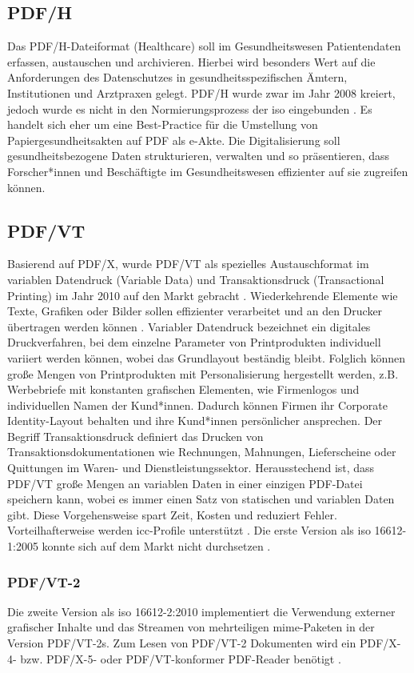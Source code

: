 \subsection{PDF/H}
Das PDF/H-Dateiformat (Healthcare) soll im Gesundheitswesen Patientendaten erfassen, austauschen und archivieren. Hierbei wird besonders Wert auf die Anforderungen des Datenschutzes in gesundheitsspezifischen Ämtern, Institutionen und Arztpraxen gelegt. PDF/H wurde zwar im Jahr 2008 kreiert, jedoch wurde es nicht in den Normierungsprozess der \gls{iso} eingebunden \cite{proj-consult}. Es handelt sich eher um eine Best-Practice für die Umstellung von Papiergesundheitsakten auf PDF als e-Akte. Die Digitalisierung soll gesundheitsbezogene Daten strukturieren, verwalten und so präsentieren, dass Forscher*innen und Beschäftigte im Gesundheitswesen effizienter auf sie zugreifen können.

\subsection{PDF/VT}
Basierend auf PDF/X, wurde PDF/VT als spezielles Austauschformat im variablen Datendruck (Variable Data) und Transaktionsdruck (Transactional Printing) im Jahr 2010 auf den Markt gebracht \cite{adobe-pdf-vt}.  Wiederkehrende Elemente wie Texte, Grafiken oder Bilder sollen effizienter verarbeitet und an den Drucker übertragen werden können \cite{adobe-pdf-e}. Variabler Datendruck bezeichnet ein digitales Druckverfahren, bei dem einzelne Parameter von Printprodukten individuell variiert werden können, wobei das Grundlayout beständig bleibt. Folglich können große Mengen von Printprodukten mit Personalisierung hergestellt werden, z.B. Werbebriefe mit konstanten grafischen Elementen, wie Firmenlogos und individuellen Namen der Kund*innen. Dadurch können Firmen ihr Corporate Identity-Layout behalten und ihre Kund*innen persönlicher ansprechen. Der Begriff Transaktionsdruck definiert das Drucken von Transaktionsdokumentationen wie Rechnungen, Mahnungen, Lieferscheine oder Quittungen im Waren- und Dienstleistungssektor. Herausstechend ist, dass PDF/VT große Mengen an variablen Daten in einer einzigen PDF-Datei speichern kann, wobei es immer einen Satz von statischen und variablen Daten gibt. Diese Vorgehensweise spart Zeit, Kosten und reduziert Fehler. Vorteilhafterweise werden \gls{icc}-Profile unterstützt \cite{adobe-pdf-vt}. Die erste Version als \gls{iso} 16612-1:2005 konnte sich auf dem Markt nicht durchsetzen \cite{proj-consult}.

\subsubsection{PDF/VT-2}
Die zweite Version als \gls{iso} 16612-2:2010 implementiert die Verwendung externer grafischer Inhalte und das Streamen von mehrteiligen \gls{mime}-Paketen in der Version PDF/VT-2s. Zum Lesen von PDF/VT-2 Dokumenten wird ein PDF/X-4- bzw. PDF/X-5- oder PDF/VT-konformer PDF-Reader benötigt \cite{proj-consult}.

